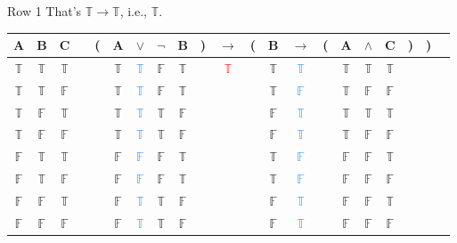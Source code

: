 \documentclass[
  ignorenonframetext,
]{beamer}
\renewcommand{\,}{\text{, }}
\def\True{\mathbb{T}}
\def\False{\mathbb{F}}
\begin{document}
\begin{frame}{Row 1}
\protect\hypertarget{row-1-1}{}
That's \(\True \rightarrow \True\), i.e., \(\True\).

\begin{center}

\begin{tabular}{@{ }c@{ }@{ }c@{ }@{ }c | c@{ }@{}c@{}@{ }c@{ }@{ }c@{ }@{ }c@{ }@{ }c@{ }@{}c@{}@{ }c@{ }@{}c@{}@{ }c@{ }@{ }c@{ }@{}c@{}@{ }c@{ }@{ }c@{ }@{ }c@{ }@{}c@{}@{}c@{}@{ }c}
A & B & C &  & ( & A & $\vee$ & $\neg$ & B & ) & $\rightarrow$ & ( & B & $\rightarrow$ & ( & A & $\wedge$ & C & ) & ) & \\
\hline 
 $\True$ & $\True$ & $\True$ &  &  & $\True$ & \textcolor{dodgerblue}{$\True$} & $\False$ & $\True$ &  &\textcolor{red}{$\True$}&  & $\True$ & \textcolor{dodgerblue}{$\True$} &  & $\True$ & $\True$ & $\True$ &  &  & \\
 $\True$ & $\True$ & $\False$ &  &  & $\True$ & \textcolor{dodgerblue}{$\True$} & $\False$ & $\True$ &  &&  & $\True$ & \textcolor{dodgerblue}{$\False$} &  & $\True$ & $\False$ & $\False$ &  &  & \\
 $\True$ & $\False$ & $\True$ &  &  & $\True$ & \textcolor{dodgerblue}{$\True$} & $\True$ & $\False$ &  &&  & $\False$ & \textcolor{dodgerblue}{$\True$} &  & $\True$ & $\True$ & $\True$ &  &  & \\
 $\True$ & $\False$ & $\False$ &  &  & $\True$ & \textcolor{dodgerblue}{$\True$} & $\True$ & $\False$ &  &&  & $\False$ & \textcolor{dodgerblue}{$\True$} &  & $\True$ & $\False$ & $\False$ &  &  & \\
 $\False$ & $\True$ & $\True$ &  &  & $\False$ & \textcolor{dodgerblue}{$\False$} & $\False$ & $\True$ &  &&  & $\True$ & \textcolor{dodgerblue}{$\False$} &  & $\False$ & $\False$ & $\True$ &  &  & \\
 $\False$ & $\True$ & $\False$ &  &  & $\False$ & \textcolor{dodgerblue}{$\False$} & $\False$ & $\True$ &  &&  & $\True$ & \textcolor{dodgerblue}{$\False$} &  & $\False$ & $\False$ & $\False$ &  &  & \\
 $\False$ & $\False$ & $\True$ &  &  & $\False$ & \textcolor{dodgerblue}{$\True$} & $\True$ & $\False$ &  &&  & $\False$ & \textcolor{dodgerblue}{$\True$} &  & $\False$ & $\False$ & $\True$ &  &  & \\
 $\False$ & $\False$ & $\False$ &  &  & $\False$ & \textcolor{dodgerblue}{$\True$} & $\True$ & $\False$ &  &&  & $\False$ & \textcolor{dodgerblue}{$\True$} &  & $\False$ & $\False$ & $\False$ &  &  & \\
\end{tabular}

\end{center}
\end{frame}
\end{document}
